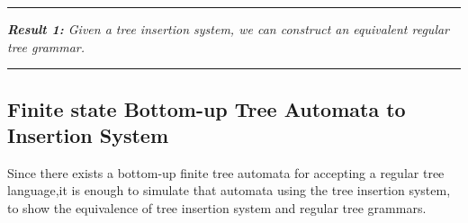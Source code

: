 \begin{example}
\noindent \rule{\textwidth}{1pt}
\end{example}    
   
\emph{\textbf{Result 1:} Given a tree insertion system, we can construct an equivalent regular tree grammar.}\\
\noindent \rule{\textwidth}{1pt}

\subsection{Finite state Bottom-up Tree Automata to Insertion System}
Since there exists a bottom-up finite tree automata for accepting a regular tree language,it is enough to simulate that 
automata using the tree insertion system, to show the equivalence of tree insertion system and regular tree grammars.

